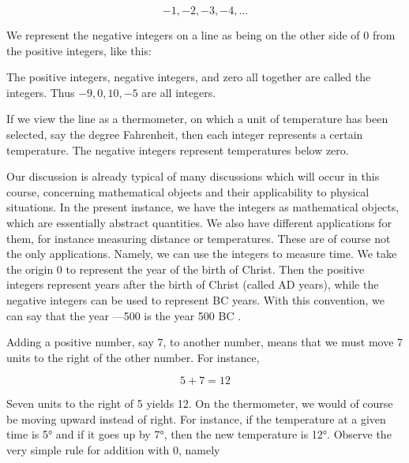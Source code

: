 \documentclass[paper=a4,oneside,fontsize=12pt, parskip=full]{scrartcl}
\begin{document}
    \[-1,-2,-3,-4,\dots\]

    We represent the negative integers on a line as being on the other side of 0
    from the positive integers, like this:

    \begin{center}
    \end{center}

    The positive integers, negative integers, and zero all together are called the integers.
    Thus $-9, 0, 10, -5$ are all integers.

    If we view the line as a thermometer, on which a unit of temperature has
    been selected, say the degree Fahrenheit, then each integer represents a certain temperature.
    The negative integers represent temperatures below zero.

    Our discussion is already typical of many discussions which will occur in
    this course, concerning mathematical objects and their applicability to physical situations.
    In the present instance, we have the integers as mathematical objects, which are essentially abstract quantities.
    We also have different applications for them, for instance measuring distance or temperatures.
    These are of course not the only applications.
    Namely, we can use the integers to measure time.
    We take the origin 0 to represent the year of the birth of Christ.
    Then the positive integers represent years after the birth of Christ (called AD years),
    while the negative integers can be used to represent BC years.
    With this convention, we can say that the year —500 is the year 500 BC .

    Adding a positive number, say 7, to another number, means that we must move 7 units to the right of the other number.
    For instance,

    \[5+7=12\]

    Seven units to the right of 5 yields 12.
    On the thermometer, we would of course be moving upward instead of right.
    For instance, if the temperature at a given time is 5° and if it goes up by 7°, then the new temperature is 12°.
    Observe the very simple rule for addition with 0, namely
\end{document}
